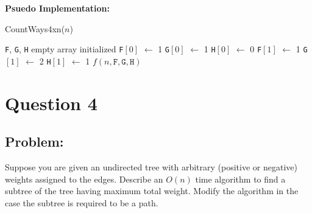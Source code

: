 \documentclass[11pt, fleqn]{article}
\begin{document}
\textbf{Psuedo Implementation:}\\
\begin{algorithm}[H]
    \SetAlgoLined
    \DontPrintSemicolon
    
    \caption{CountWays4xn($n$)}



    \;
    \;
    \;
    \texttt{F}, \texttt{G}, \texttt{H} empty array initialized\;
    \texttt{F}$[0]$ $\leftarrow$ 1\;
    \texttt{G}$[0]$ $\leftarrow$ 1\;
    \texttt{H}$[0]$ $\leftarrow$ 0\;
    \texttt{F}$[1]$ $\leftarrow$ 1\;
    \texttt{G}$[1]$ $\leftarrow$ 2\;
    \texttt{H}$[1]$ $\leftarrow$ 1\;
    \;
    \KwRet $f(n, \texttt{F}, \texttt{G}, \texttt{H})$\;
\end{algorithm}

 
\newpage 
\section*{Question 4}
\label{q4}
\setcounter{equation}{0}

\subsection*{Problem:}
Suppose you are given an undirected tree with arbitrary (positive or negative) weights assigned to the edges. Describe an $O(n)$ time algorithm to find a subtree of the tree having maximum total weight. Modify the algorithm in the case the subtree is required to be a path.
\end{document}
